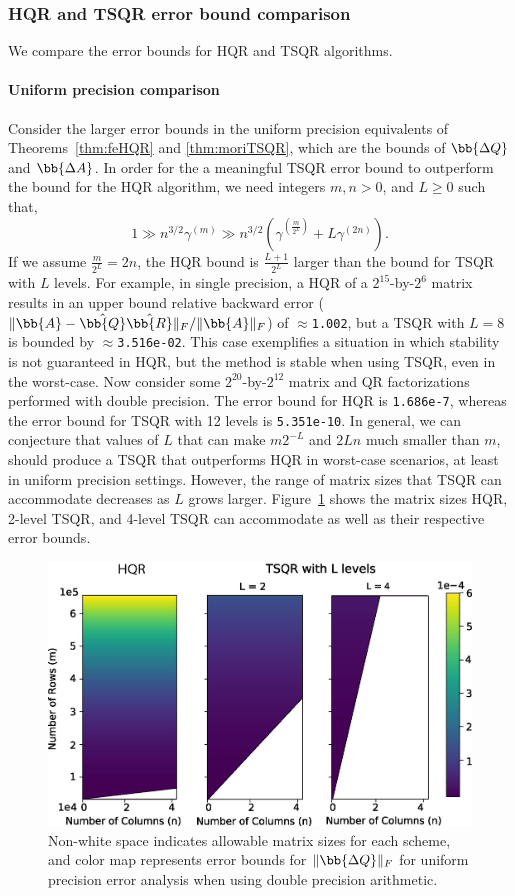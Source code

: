\subsubsection{HQR and TSQR error bound comparison}
\label{sec:HTSQR}
We compare the error bounds for HQR and TSQR algorithms. 
\paragraph{Uniform precision comparison}Consider the larger error bounds in the uniform precision equivalents of Theorems~\ref{thm:feHQR} and \ref{thm:moriTSQR}, which are the bounds of $\bb{\Delta Q}$ and $\bb{\Delta A}$. 
In order for the a meaningful TSQR error bound to outperform the bound for the HQR algorithm, we need integers $m, n > 0$, and $L\geq0$ such that,
\begin{equation*}
1\gg n^{3/2}\gamma^{(m)} \gg n^{3/2}(\gamma^{(\frac{m}{2^L})}+L\gamma^{(2n)}).
\end{equation*}
If we assume $\frac{m}{2^L}=2n$, the HQR bound is $\frac{L+1}{2^L}$ larger than the bound for TSQR with $L$ levels. 
For example, in single precision, a HQR of a $2^{15}$-by-$2^6$ matrix results in an upper bound relative backward error ($\|\bb{A}-\hat{\bb{Q}}\hat{\bb{R}}\|_F/\|\bb{A}\|_F$) of $\approx${\tt1.002}, but a TSQR with $L=8$ is bounded by $\approx${\tt 3.516e-02}. 
This case exemplifies a situation in which stability is not guaranteed in HQR, but the method is stable when using TSQR, even in the worst-case. 
Now consider some $2^{20}$-by-$2^{12}$ matrix and QR factorizations performed with double precision.
The error bound for HQR is {\tt 1.686e-7}, whereas the error bound for TSQR with 12 levels is {\tt 5.351e-10}.
In general, we can conjecture that values of $L$ that can make $m2^{-L}$ and $2Ln$ much smaller than $m$, should produce a TSQR that outperforms HQR in worst-case scenarios, at least in uniform precision settings.
However, the range of matrix sizes that TSQR can accommodate decreases as $L$ grows larger.
Figure~\ref{fig:paramspace} shows the matrix sizes HQR, 2-level TSQR, and 4-level TSQR can accommodate as well as their respective error bounds.\par
\begin{figure}
	\centering
	\includegraphics[width=.45\textwidth]{./figures/paramspace.png}
	\caption{\label{fig:paramspace} Non-white space indicates allowable matrix sizes for each scheme, and color map represents error bounds for $\|\bb{\Delta Q}\|_F$ for uniform precision error analysis when using double precision arithmetic.}
	\vspace{-10pt}	
\end{figure}
